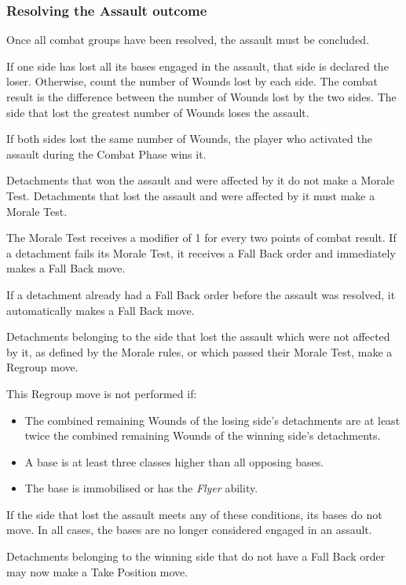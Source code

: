 \subsubsection{Resolving the Assault outcome}

Once all combat groups have been resolved, the assault must be concluded.

If one side has lost all its bases engaged in the assault, that side is declared the loser. Otherwise, count the number of Wounds lost by each side. The combat result is the difference between the number of Wounds lost by the two sides. The side that lost the greatest number of Wounds loses the assault.

If both sides lost the same number of Wounds, the player who activated the assault during the Combat Phase wins it.

Detachments that won the assault and were affected by it do not make a Morale Test. Detachments that lost the assault and were affected by it must make a Morale Test.

The Morale Test receives a modifier of 1 for every two points of combat result. If a detachment fails its Morale Test, it receives a Fall Back order and immediately makes a Fall Back move.

If a detachment already had a Fall Back order before the assault was resolved, it automatically makes a Fall Back move.

Detachments belonging to the side that lost the assault which were not affected by it, as defined by the Morale rules, or which passed their Morale Test, make a Regroup move.

This Regroup move is not performed if:

\begin{itemize}
    \item The combined remaining Wounds of the losing side's detachments are at least twice the combined remaining Wounds of the winning side's detachments.
    \item A base is at least three classes higher than all opposing bases.
    \item The base is immobilised or has the \textit{Flyer} ability.
\end{itemize}

If the side that lost the assault meets any of these conditions, its bases do not move. In all cases, the bases are no longer considered engaged in an assault.

Detachments belonging to the winning side that do not have a Fall Back order may now make a Take Position move.

